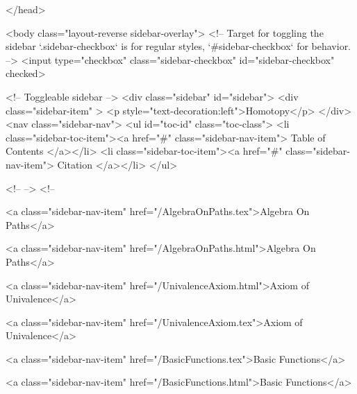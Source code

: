  
</head>




  <body class="layout-reverse sidebar-overlay">
    <!-- Target for toggling the sidebar `.sidebar-checkbox` is for regular
     styles, `#sidebar-checkbox` for behavior. -->
<input type="checkbox" class="sidebar-checkbox" id="sidebar-checkbox" checked>

<!-- Toggleable sidebar -->
<div class="sidebar" id="sidebar">
  <div class="sidebar-item" >
    <p style="text-decoration:left">Homotopy</p>
  </div>
  <nav class="sidebar-nav">
    <ul id="toc-id" class="toc-class">
  <li class="sidebar-toc-item"><a href="#" class="sidebar-nav-item"> Table of Contents </a></li>
  <li class="sidebar-toc-item"><a href="#" class="sidebar-nav-item"> Citation </a></li>
</ul>


    <!--  -->
    <!-- 
      
    
      
    
      
    
      
        
      
    
      
        
          <a class="sidebar-nav-item" href="/AlgebraOnPaths.tex">Algebra On Paths</a>
        
      
    
      
        
          <a class="sidebar-nav-item" href="/AlgebraOnPaths.html">Algebra On Paths</a>
        
      
    
      
        
          <a class="sidebar-nav-item" href="/UnivalenceAxiom.html">Axiom of Univalence</a>
        
      
    
      
        
          <a class="sidebar-nav-item" href="/UnivalenceAxiom.tex">Axiom of Univalence</a>
        
      
    
      
        
          <a class="sidebar-nav-item" href="/BasicFunctions.tex">Basic Functions</a>
        
      
    
      
        
          <a class="sidebar-nav-item" href="/BasicFunctions.html">Basic Functions</a>
        
      
    
      
        
